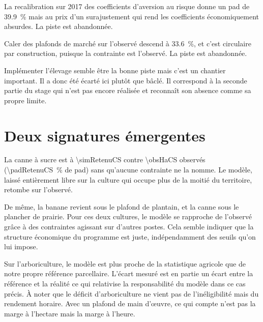 La recalibration sur 2017 des coefficients d'aversion au risque donne un \gls{pad} de
\SI{39.9}{\percent} mais au prix d'un surajustement qui rend les coefficients économiquement
absurdes. La piste est abandonnée.

Caler des plafonds de marché sur l'observé descend à \SI{33.6}{\percent}, et c'est circulaire
par construction, puisque la contrainte est l'observé. La piste est abandonnée.

Implémenter l'élevage semble être la bonne piste mais c'est un chantier important. Il a donc été
écarté ici plutôt que bâclé. Il correspond à la seconde partie du stage qui n'est pas encore
réalisée et \textcite{chopin2015} reconnaît son absence comme sa propre limite.

\section{Deux signatures émergentes}
\label{sec:emergence}

La canne à sucre est à \SI{\simRetenuCS}{\ha} contre \SI{\obsHaCS}{\ha} observés
(\SI{\padRetenuCS}{\percent} de \gls{pad}) sans qu'aucune contrainte ne la nomme. Le modèle,
laissé entièrement libre sur la culture qui occupe plus de la moitié du territoire, retombe sur
l'observé.

De même, la banane revient sous le plafond de plantain, et la canne sous le plancher de prairie.
Pour ces deux cultures, le modèle se rapproche de l'observé grâce à des contraintes agissant sur
d'autres postes. Cela semble indiquer que la structure économique du programme est juste,
indépendamment des seuils qu'on lui impose.

Sur l'arboriculture, le modèle est plus proche de la statistique agricole que de notre propre
référence parcellaire. L'écart mesuré est en partie un écart entre la référence et la réalité ce
qui relativise la responsabilité du modèle dans ce cas précis. À noter que le déficit
d'arboriculture ne vient pas de l'inéligibilité mais du rendement horaire. Avec un plafond de
main d'\oe uvre, ce qui compte n'est pas la marge à l'hectare mais la marge à l'heure.
